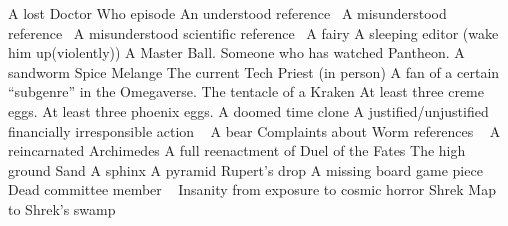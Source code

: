 \begin{multicols}{2}
\begin{small}
\begin{tabbing}
           {A lost Doctor Who episode}
           {An understood reference~\E}
          {A misunderstood reference~\E}
         {A misunderstood scientific reference~\E}
          {A fairy}
            {A sleeping editor (wake him up(violently))}
        {A Master Ball.}
        {Someone who has watched Pantheon.}
            {A sandworm}
            {Spice Melange}
        {The current Tech Priest (in person)}
          {A fan of a certain ``subgenre'' in the Omegaverse.}
       {The tentacle of a Kraken} 
           {At least three creme eggs.}
        {At least three phoenix eggs.}
            {A doomed time clone}
             {A justified/unjustified financially irresponsible action ~\FD}
              {A bear}
             {Complaints about Worm references ~\E}
             {A reincarnated Archimedes}
            {A full reenactment of Duel of the Fates}
               {The high ground}
            {Sand}
        {A sphinx}
        {A pyramid}
         {Rupert's drop}
           {A missing board game piece ~\E}
             {Dead committee member ~\E}
            {Insanity from exposure to cosmic horror}
        {Shrek}
        {Map to Shrek's swamp}

\end{tabbing}
\end{small}
\end{multicols}
